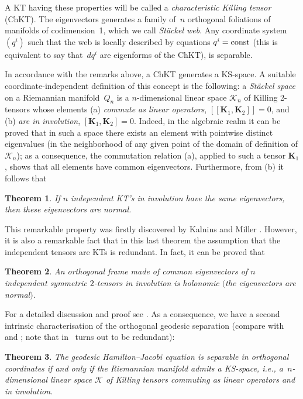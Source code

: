 \documentclass[10pt,a4paper]{amsart}
\def\bs{\boldsymbol}
\numberwithin{equation}{section}
\newtheorem{Theorem}{Theorem}[section]
 { \theoremstyle{definition}
\newtheorem{Notation}[Theorem]{Notation}
\newtheorem{Example}[Theorem]{Example}
\newtheorem{Remark}[Theorem]{Remark}
\newtheorem{Remarks}[Theorem]{Remarks}
 }
\providecommand{\cal}{\mathcal}
\begin{document}
A KT having these properties will be called a {\it characteristic Killing tensor} (ChKT). The eigenvectors generates a family of~$n$ orthogonal foliations  of manifolds of codimension~1, which we call {\it St\"ackel web}. Any coordinate system~$(q^i)$ such that the web is locally described by equations $q^i={\rm const}$ (this is equivalent to say that~$dq^i$ are eigenforms of the ChKT),
is separable.

In accordance with the remarks above, a ChKT generates a KS-space. A suitable coordinate-independent def\/inition of this concept is the following: a {\it St\"ackel space} on a Riemannian mani\-fold~$Q_n$ is a $n$-dimensional linear space ${\cal K}_n$ of Killing 2-tensors whose elements (a) {\it commute as linear operators}, $[ \! [\bs K_1,\bs K_2] \! ]=0$, and (b) {\it are in involution}, $[\bs K_1,\bs K_2]=0$. Indeed, in the algebraic realm it can be proved that in such a space there exists an element with pointwise distinct eigenvalues (in the neighborhood of any given point of the domain of def\/inition of ${\cal K}_n$); as a consequence, the commutation relation (a), applied to such a tensor $\bs K_1$, shows that all elements have common eigenvectors. Furthermore, from (b) it follows that

\begin{Theorem}\label{t:3.3}
If $n$ independent KT's in involution have the same eigenvectors, then these eigenvectors are normal.
\end{Theorem}

This remarkable property was f\/irstly discovered by Kalnins and Miller \cite{KM-1980}. However, it is also a remarkable fact that in this last theorem the assumption that the independent tensors are KTs is redundant. In fact, it can be proved that

\begin{Theorem}\label{t:3.4}
An orthogonal frame made of common eigenvectors of $n$ independent symmetric $2$-tensors in involution is holonomic $($the eigenvectors are normal$)$.
\end{Theorem}

For a detailed discussion and proof see \cite{BCR-2002a}. As a consequence, we have a second intrinsic characterisation of the orthogonal geodesic separation (compare with \cite[Theorem~6, Section~3]{KM-1980} and \cite{Shapovalov-1981}; note that in~\cite[Theorem~6(4)]{KM-1980}  turns out to be redundant):

\begin{Theorem}\label{t:3.5}
The geodesic Hamilton--Jacobi equation is separable in orthogonal coordinates if and only if the Riemannian manifold admits a KS-space, i.e., a~$n$-dimensional linear space ${\cal K}$ of Killing tensors commuting as linear operators and in involution.
\end{Theorem}
\end{document}
